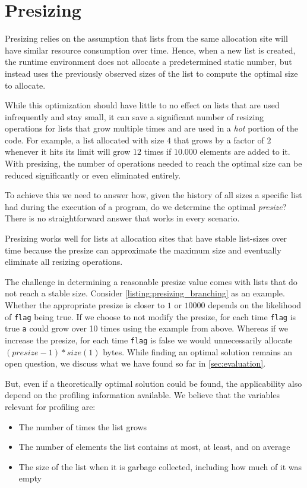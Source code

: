 \documentclass[sigconf, review, balance=false]{acmart}
\begin{document}
\section{Presizing}
\label{sec:presizing}
Presizing relies on the assumption that lists from the same
allocation site will have similar resource consumption over
time. Hence, when a new list is created, the runtime environment does
not allocate a predetermined static number, but instead uses the
previously observed sizes of the list to compute the optimal size to
allocate.

While this optimization should have little to no effect on lists that
are used infrequently and stay small, it can save a significant number
of resizing operations for lists that grow multiple times and are
used in a \emph{hot} portion of the code.  For example, a list
allocated with size $4$ that grows by a factor of $2$ whenever it hits
its limit will grow $12$ times if $10.000$ elements are added to
it. With presizing, the number of operations needed to reach the
optimal size can be reduced significantly or even eliminated entirely.

To achieve this we need to answer how, given the history of all sizes
a specific list had during the execution of a program, do we
determine the optimal \emph{presize}? There is no straightforward
answer that works in every scenario.

Presizing works well for lists at allocation sites that have stable
list-sizes over time because the presize can approximate the maximum
size and eventually eliminate all resizing operations.

The challenge in determining a reasonable presize value comes with
lists that do not reach a stable size. Consider
\autoref{listing:presizing_branching} as an example. Whether the
appropriate presize is closer to $1$ or $10000$ depends on the
likelihood of \lstinline{flag} being true. If we choose to not modify
the presize, for each time \lstinline{flag} is true \lstinline{a}
could grow over 10 times using the example from above. Whereas if we
increase the presize, for each time \lstinline{flag} is false we would
unnecessarily allocate $(presize - 1) * size(1)$ bytes. While finding
an optimal solution remains an open question, we discuss what we have
found so far in \autoref{sec:evaluation}.

But, even if a theoretically optimal solution could be found, the
applicability also depend on the profiling information available. We
believe that the variables relevant for profiling are:
\begin{itemize}
\item The number of times the list grows
\item The number of elements the list contains at most, at least, and
on average
\item The size of the list when it is garbage collected, including
how much of it was empty
\end{itemize}
\end{document}
